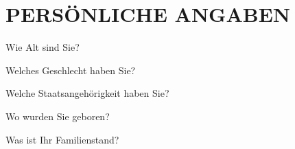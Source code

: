 
\section{\uppercase{Persönliche Angaben}}
\vspace{-.15cm}

\begin{choicequestion}[6]{Wie Alt sind Sie?}
\end{choicequestion}

\vspace{-.15cm}
\separate
\vspace{-.15cm}

\begin{choicequestion}[1]{Welches Geschlecht haben Sie?}
\end{choicequestion}

\vspace{-.15cm}
\separate
\vspace{-.15cm}

\begin{choicequestion}[4]{Welche Staatsangehörigkeit haben Sie?}
	 \\
\end{choicequestion}

\vspace{-.15cm}
\separate
\vspace{-.15cm}

\begin{choicequestion}[4]{Wo wurden Sie geboren?}
	 \\
\end{choicequestion}

\vspace{-.15cm}
\separate
\vspace{-.15cm}

\begin{choicequestion}[1]{Was ist Ihr Familienstand?}
\end{choicequestion}

\vspace{-.15cm}
\separate
\vspace{-.15cm}

